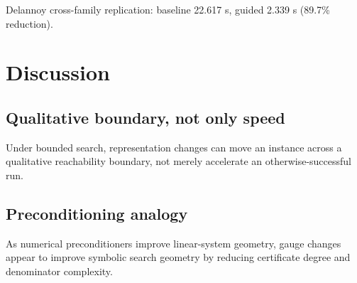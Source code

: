 \documentclass[11pt]{article}
\begin{document}
\begin{table}[htbp]
\centering
\footnotesize
\setlength{\tabcolsep}{3pt}
\caption{Guided denominator selection reduces candidate set size and runtime in the binomial-power family.}
\label{tab:phenomenon-b}
\end{table}

Delannoy cross-family replication: baseline 22.617 s, guided 2.339 s (89.7\% reduction).

\section{Discussion}
\subsection{Qualitative boundary, not only speed}
Under bounded search, representation changes can move an instance across a qualitative reachability boundary, not merely accelerate an otherwise-successful run.

\subsection{Preconditioning analogy}
As numerical preconditioners improve linear-system geometry, gauge changes appear to improve symbolic search geometry by reducing certificate degree and denominator complexity.
\end{document}
